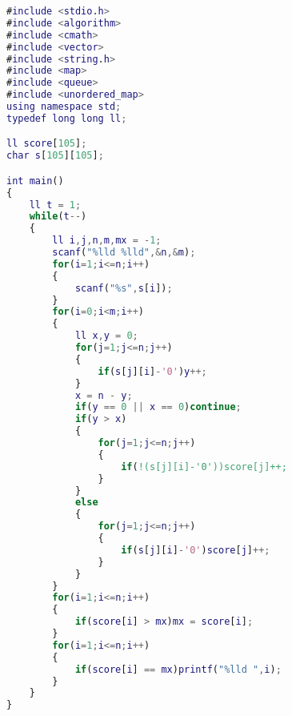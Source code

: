 \documentclass{article}
\begin{document}
\lstset{style=myStyle}
\begin{lstlisting}[caption=소스코드, language=Matlab]
#include <stdio.h>
#include <algorithm>
#include <cmath>
#include <vector>
#include <string.h>
#include <map>
#include <queue>
#include <unordered_map>
using namespace std;
typedef long long ll;

ll score[105];
char s[105][105];

int main()
{
    ll t = 1;
    while(t--)
    {
        ll i,j,n,m,mx = -1;
        scanf("%lld %lld",&n,&m);
        for(i=1;i<=n;i++)
        {
            scanf("%s",s[i]);
        }
        for(i=0;i<m;i++)
        {
            ll x,y = 0;
            for(j=1;j<=n;j++)
            {
                if(s[j][i]-'0')y++;
            }
            x = n - y;
            if(y == 0 || x == 0)continue;
            if(y > x)
            {
                for(j=1;j<=n;j++)
                {
                    if(!(s[j][i]-'0'))score[j]++;
                }
            }
            else
            {
                for(j=1;j<=n;j++)
                {
                    if(s[j][i]-'0')score[j]++;
                }
            }
        }
        for(i=1;i<=n;i++)
        {
            if(score[i] > mx)mx = score[i];
        }
        for(i=1;i<=n;i++)
        {
            if(score[i] == mx)printf("%lld ",i);
        }
    }
}

\end{lstlisting}
\end{document}
